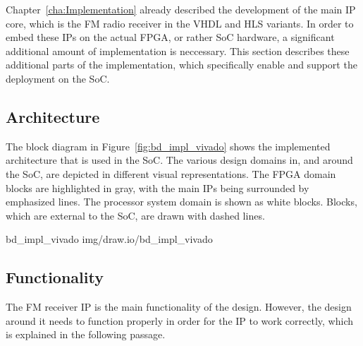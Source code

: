 Chapter~\ref{cha:Implementation} already described the development of the main IP core, which is the FM radio receiver in the VHDL and HLS variants.
In order to embed these IPs on the actual FPGA, or rather SoC hardware, a significant additional amount of implementation is neccessary.
This section describes these additional parts of the implementation, which specifically enable and support the deployment on the SoC.

\subsection{Architecture}

The block diagram in Figure~\ref{fig:bd_impl_vivado} shows the implemented architecture that is used in the SoC.
The various design domains in, and around the SoC, are depicted in different visual representations.
The FPGA domain blocks are highlighted in gray, with the main IPs being surrounded by emphasized lines.
The processor system domain is shown as white blocks.
Blocks, which are external to the SoC, are drawn with dashed lines.

 {bd_impl_vivado} {img/draw.io/bd_impl_vivado}

\subsection{Functionality}

The FM receiver IP is the main functionality of the design.
However, the design around it needs to function properly in order for the IP to work correctly, which is explained in the following passage.\\

